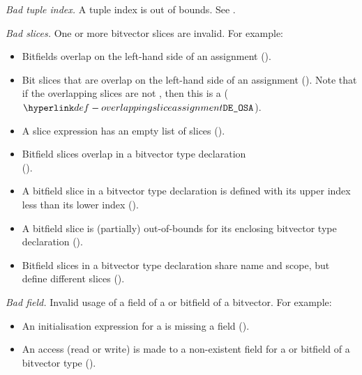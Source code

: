 \begin{description}
\hypertarget{def-badtupleindex}{}
\item[$\BadTupleIndex$]
  \textit{Bad tuple index.}
  A tuple index is out of bounds.
  See .

\hypertarget{def-badslices}{}
\item[$\BadSlices$]
  \textit{Bad slices.}
  One or more bitvector slices are invalid.
  For example:
  \begin{itemize}
    \item Bitfields overlap on the left-hand side of an assignment ().
    \item Bit slices that are \symbolicallyevaluableterm{} overlap on the left-hand side of an assignment ().
      Note that if the overlapping slices are not \symbolicallyevaluableterm{}, then this is a \dynamicerrorterm{} ($\OverlappingSliceAssignment$).
    \item A slice expression has an empty list of slices ().
    \item Bitfield slices overlap in a bitvector type declaration \\
      ().
    \item A bitfield slice in a bitvector type declaration is defined with its upper index less than its lower index ().
    \item A bitfield slice is (partially) out-of-bounds for its enclosing bitvector type declaration ().
    \item Bitfield slices in a bitvector type declaration share name and scope, but define different slices ().
  \end{itemize}

\hypertarget{def-badfield}{}
\item[$\BadField$]
  \textit{Bad field.}
  Invalid usage of a field of a \structuredtypeterm{} or bitfield of a bitvector.
  For example:
  \begin{itemize}
    \item An initialisation expression for a \structuredtypeterm{} is missing a field ().
    \item An access (read or write) is made to a non-existent field for a \structuredtypeterm{} or bitfield of a bitvector type ().
  \end{itemize}


\end{description}

